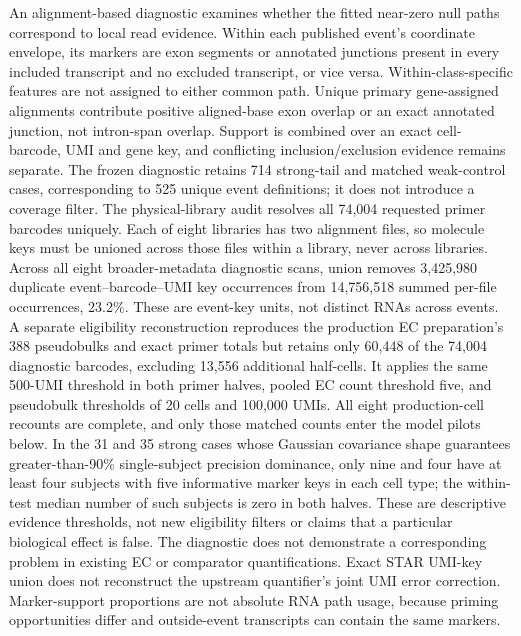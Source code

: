 \documentclass[11pt]{article}
\begin{document}
An alignment-based diagnostic examines whether the fitted near-zero null paths correspond to local read evidence. Within each published event's coordinate envelope, its markers are exon segments or annotated junctions present in every included transcript and no excluded transcript, or vice versa. Within-class-specific features are not assigned to either common path. Unique primary gene-assigned alignments contribute positive aligned-base exon overlap or an exact annotated junction, not intron-span overlap. Support is combined over an exact cell-barcode, UMI and gene key, and conflicting inclusion/exclusion evidence remains separate. The frozen diagnostic retains 714 strong-tail and matched weak-control cases, corresponding to 525 unique event definitions; it does not introduce a coverage filter. The physical-library audit resolves all 74,004 requested primer barcodes uniquely. Each of eight libraries has two alignment files, so molecule keys must be unioned across those files within a library, never across libraries. Across all eight broader-metadata diagnostic scans, union removes 3,425,980 duplicate event--barcode--UMI key occurrences from 14,756,518 summed per-file occurrences, 23.2\%. These are event-key units, not distinct RNAs across events. A separate eligibility reconstruction reproduces the production EC preparation's 388 pseudobulks and exact primer totals but retains only 60,448 of the 74,004 diagnostic barcodes, excluding 13,556 additional half-cells. It applies the same 500-UMI threshold in both primer halves, pooled EC count threshold five, and pseudobulk thresholds of 20 cells and 100,000 UMIs. All eight production-cell recounts are complete, and only those matched counts enter the model pilots below. In the 31 and 35 strong cases whose Gaussian covariance shape guarantees greater-than-90\% single-subject precision dominance, only nine and four have at least four subjects with five informative marker keys in each cell type; the within-test median number of such subjects is zero in both halves. These are descriptive evidence thresholds, not new eligibility filters or claims that a particular biological effect is false. The diagnostic does not demonstrate a corresponding problem in existing EC or comparator quantifications. Exact STAR UMI-key union does not reconstruct the upstream quantifier's joint UMI error correction. Marker-support proportions are not absolute RNA path usage, because priming opportunities differ and outside-event transcripts can contain the same markers.
\end{document}
